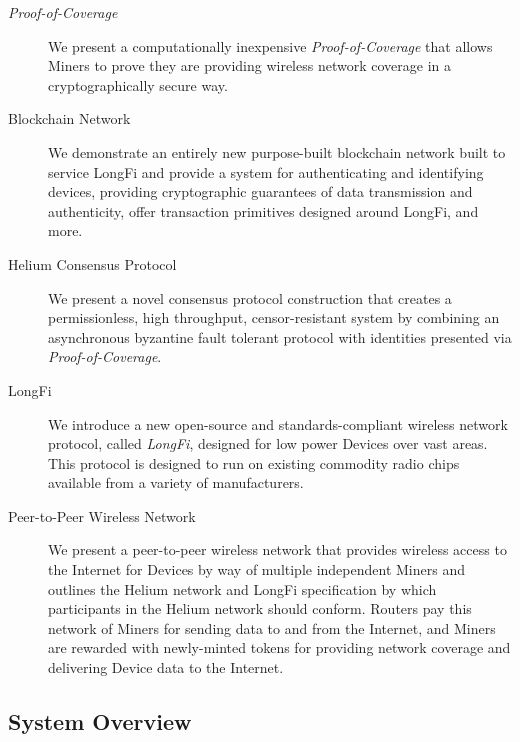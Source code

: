 \documentclass[10pt, nonatbib, nocopyrightspace, reprint]{sigplanconf}
\begin{document}
\begin{description}
  \item [\emph{Proof-of-Coverage}] We present a computationally inexpensive \emph{Proof-of-Coverage} that allows Miners to prove they are providing wireless network coverage in a cryptographically secure way.

  \item [Blockchain Network] We demonstrate an entirely new purpose-built block\-chain network built to service LongFi and provide a system for authenticating and identifying devices, providing cryptographic guarantees of data transmission and authenticity, offer transaction primitives designed around LongFi, and more.

  \item [Helium Consensus Protocol] We present a novel consensus protocol construction that creates a permissionless, high throughput, censor-resistant system by combining an asynchronous byzantine fault tolerant protocol with identities presented via \emph{Proof-of-Coverage}.

  \item [LongFi] We introduce a new open-source and standards-compliant wireless network protocol, called \emph{LongFi}, designed for low power Devices over vast areas. This protocol is designed to run on existing commodity radio chips available from a variety of manufacturers.

  \item [Peer-to-Peer Wireless Network] We present a peer-to-peer wireless network that provides wireless access to the Internet for Devices by way of multiple independent Miners and outlines the Helium network and LongFi specification by which participants in the Helium network should conform. Routers pay this network of Miners for sending data to and from the Internet, and Miners are rewarded with newly-minted tokens for providing network coverage and delivering Device data to the Internet.
\end{description}

\subsection{System Overview}
\end{document}
